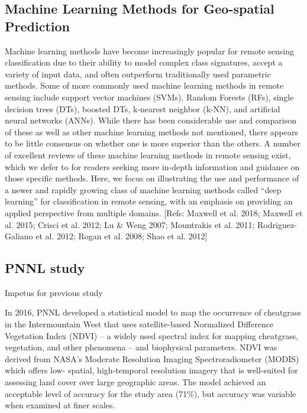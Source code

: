\def\year{2017}\relax \documentclass[letterpaper]{article}
\begin{document}
\subsection{Machine Learning Methods for Geo-spatial Prediction}
Machine learning methods have become increasingly popular for remote sensing classification due to their ability to model complex class signatures, accept a variety of input data, and often outperform traditionally used parametric methods. Some of more commonly used machine learning methods in remote sensing include support vector machines (SVMs), Random Forests (RFs), single decision trees (DTs), boosted DTs, k-nearest neighbor (k-NN), and artificial neural networks (ANNs). While there has been considerable use and comparison of these as well as other machine learning methods not mentioned, there appears to be little consensus on whether one is more superior than the others. A number of excellent reviews of these machine learning methods in remote sensing exist, which we defer to for readers seeking more in-depth information and guidance on those specific methods. Here, we focus on illustrating the use and performance of a newer and rapidly growing class of machine learning methods called “deep learning” for classification in remote sensing, with an emphasis on providing an applied perspective from multiple domains. [Refs: Maxwell et al. 2018; Maxwell et al. 2015; Crisci et al. 2012; Lu \& Weng 2007; Mountrakis et al. 2011; Rodriguez-Galiano et al. 2012; Rogan et al. 2008; Shao et al. 2012]

\subsection{PNNL study}
Impetus for previous study

In 2016, PNNL developed a statistical model to map the occurrence of cheatgrass in the Intermountain West
that uses satellite-based Normalized Difference Vegetation Index (NDVI) – a widely used spectral index
for mapping cheatgrass, vegetation, and other phenomena – and biophysical parameters. NDVI was
derived from NASA’s Moderate Resolution Imaging Spectroradiometer (MODIS) which offers low-
spatial, high-temporal resolution imagery that is well-suited for assessing land cover over large
geographic areas. The model achieved an acceptable level of accuracy for the study area (71\%), but
accuracy was variable when examined at finer scales. 
\end{document}
